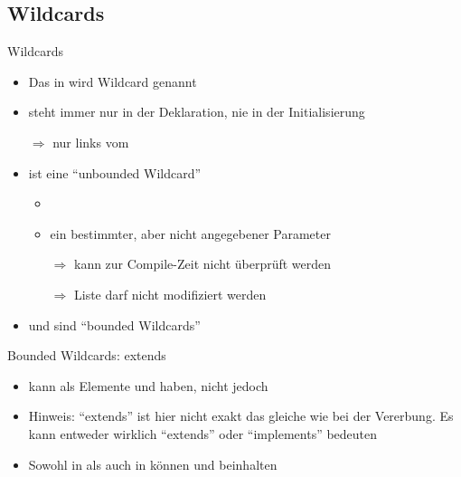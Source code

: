 \documentclass[usepdftitle=false,hyperref={pdfpagelabels=false}]{beamer}
\begin{document}
\subsection{Wildcards}
\begin{frame}{Wildcards}
    \begin{itemize}[<+->]
        \item Das  in  wird Wildcard
              genannt
        \item {} steht immer nur in der Deklaration, nie in der Initialisierung
        \item[$\Rightarrow$]  nur links vom \myCode{=}
        \item {} ist eine "`unbounded Wildcard"'
            \begin{itemize}
                \item \inputminted[linenos=false, numbersep=5pt, tabsize=4, fontsize=\tiny, firstline=1, lastline=3]{java}{singleLines.java}
                \item {} ein bestimmter, aber nicht angegebener Parameter\\
                \item[$\Rightarrow$] kann zur Compile-Zeit nicht überprüft werden\\
                \item[$\Rightarrow$] Liste darf nicht modifiziert werden
            \end{itemize}
        \item {} und  sind "`bounded Wildcards"'
    \end{itemize}
\end{frame}

\begin{frame}{Bounded Wildcards: extends}
    \begin{itemize}[<+->]
        \item {} kann als Elemente
               und  haben, nicht jedoch
        \item Hinweis: "`extends"' ist hier nicht exakt das gleiche
              wie bei der Vererbung. Es kann entweder wirklich "`extends"'
              oder "`implements"' bedeuten
        \item Sowohl in  als auch in
               können
               und  beinhalten
    \end{itemize}
\end{frame}
\end{document}

